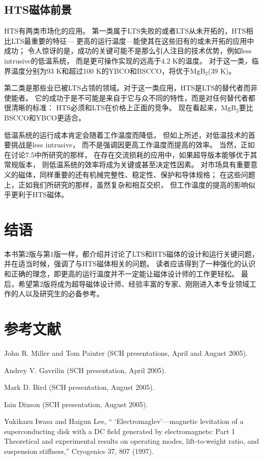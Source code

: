\subsection{HTS磁体前景}
HTS有两类市场化的应用。
第一类属于LTS失败的或者LTS从未开拓的，HTS相比LTS最重要的特征---
更高的运行温度---能使其在这些旧有的或未开拓的应用中成功；
令人惊讶的是，成功的关键可能不是那么引人注目的技术优势，例如less intrusive的低温系统，
而是更可操作实现的远高于4.2 K的温度。
对于这一类，临界温度分别为93 K和超过100 K的YBCO和BSCCO，将优于$\mathrm{MgB_2}$(39 K)。
	
第二类是那些业已被LTS占领的领域。对于这一类应用，HTS是LTS的替代者而非使能者。
它的成功于是不可能是来自于它与众不同的特性，而是对任何替代者都很清晰的标准：
HTS必须和LTS在价格上正面的竞争。
现在看起来，$\mathrm{MgB_2}$要比BSCCO和YBCO更适合。
	
低温系统的运行成本肯定会随着工作温度而降低，
但如上所述，对低温技术的首要挑战是less intrusive，
而不是强调因更高工作温度而提高的效率。
当然，正如在讨论7.5中所研究的那样，
在存在交流损耗的应用中，如果超导版本能够优于其常规版本，
则低温系统的效率将成为关键或甚至决定性因素。
对市场具有重要意义的磁体，同样重要的还有机械完整性、稳定性、保护和导体规格；
在这些问题上，正如我们所研究的那样，虽然复杂和相互交织，
但工作温度的提高的影响似乎更利于HTS磁体。	

\section{结语}
本书第2版​​与第1版一样，都介绍并讨论了LTS和HTS磁体的设计和运行关键问题，
并在适当时候，强调了与HTS磁体相关的问题。
读者应该得到了一种强化的认识和正确的理念，即更高的运行温度并不一定能让磁体设计师的工作更轻松。
最后，希望第2版将成为超导磁体设计师、经验丰富的专家、刚刚进入本专业领域工作的人以及研究生的必备参考。

\section*{参考文献}
\noindent [9.1] John R. Miller and Tom Painter (SCH presentations, April and August 2005).

\noindent [9.2] Andrey V. Gavrilin (SCH presentation, April 2005).

\noindent [9.3] Mark D. Bird (SCH presentation, August 2005).

\noindent [9.4] Iain Dixson (SCH presentation, August 2005).

\noindent [9.5] Yukikazu Iwasa and Haigun Lee, `` ‘Electromaglev’—magnetic levitation of a superconducting
disk with a DC field generated by electromagnets: Part 1 Theoretical
and experimental results on operating modes, lift-to-weight ratio, and suspension
stiffness,” Cryogenics 37, 807 (1997).

